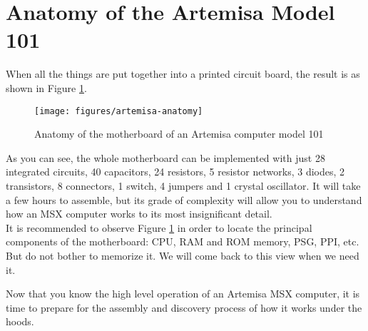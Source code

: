 \section{Anatomy of the Artemisa Model 101}

When all the things are put together into a printed circuit board, the result is as shown in Figure \ref{fig:artemisa-anatomy}.\\

\begin{figure}[h]
  \centering
  \texttt{[image: figures/artemisa-anatomy]}
  \caption{Anatomy of the motherboard of an Artemisa computer model 101}
  \label{fig:artemisa-anatomy}
\end{figure}

As you can see, the whole motherboard can be implemented with just 28 integrated circuits, 40 capacitors, 24 resistors, 5 resistor networks, 3 diodes, 2 transistors, 8 connectors, 1 switch, 4 jumpers and 1 crystal oscillator. It will take a few hours to assemble, but its grade of complexity will allow you to understand how an MSX computer works to its most insignificant detail.\\

It is recommended to observe Figure \ref{fig:artemisa-anatomy} in order to locate the principal components of the motherboard: CPU, RAM and ROM memory, PSG, PPI, etc. But do not bother to memorize it. We will come back to this view when we need it.

Now that you know the high level operation of an Artemisa MSX computer, it is time to prepare for the assembly and discovery process of how it works under the hoods.
